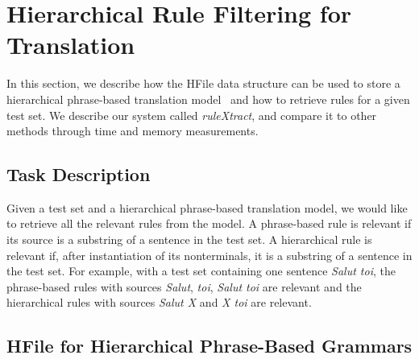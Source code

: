 \section{Hierarchical Rule Filtering for Translation}
\label{sec:rulextract}

In this section, we describe how the HFile data structure can be used
to store a hierarchical phrase-based translation model~\citep{chiang:2007:CL}
and how to retrieve rules for a given test set. We describe our system called
\emph{ruleXtract}, and compare it to other methods through time and memory
measurements.

\subsection{Task Description}

Given a test set and a hierarchical phrase-based translation model, we would
like to retrieve all the relevant rules from the model. A phrase-based rule is
relevant if its source is a substring of a sentence in the test set. A
hierarchical rule is relevant if, after instantiation of its nonterminals, it is
a substring of a sentence in the test set. For example, with a test set
containing one sentence \emph{Salut toi}, the phrase-based rules with sources
\emph{Salut}, \emph{toi}, \emph{Salut toi} are relevant and the hierarchical
rules with sources \emph{Salut X} and \emph{X toi} are relevant.

\subsection{HFile for Hierarchical Phrase-Based Grammars}


